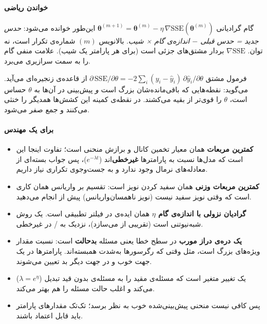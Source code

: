 \paragraph{خواندن ریاضی}

گام گرادیانی
\(\boldsymbol\theta^{(m+1)} = \boldsymbol\theta^{(m)} - \eta\,\nabla \mathrm{SSE}(\boldsymbol\theta^{(m)})\)
این‌طور خوانده می‌شود: \emph{حدس جدید = حدس قبلی \ensuremath{-} اندازه‌ی گام × شیب}.
بالانویس \((m)\) شماره‌ی تکرار است، نه توان. \(\nabla \mathrm{SSE}\)
بردار مشتق‌های جزئی است (برای هر پارامتر یک شیب). علامت منفی گام را به
سمت سرازیری می‌برد.

فرمول مشتق
\(\partial\,\mathrm{SSE}/\partial\theta = -2\sum_i (y_i - \hat y_i)\,\partial \hat y_i/\partial\theta\)
از قاعده‌ی زنجیره‌ای می‌آید. می‌گوید: نقطه‌هایی که باقی‌مانده‌شان بزرگ است
\emph{و} پیش‌بینی در آن‌ها به \(\theta\) حساس است، \(\theta\) را قوی‌تر از
بقیه می‌کشند. در نقطه‌ی کمینه این کشش‌ها همدیگر را خنثی می‌کنند و جمع صفر
می‌شود.

\paragraph{برای یک مهندس}

\begin{itemize}
\tightlist
\item
  \textbf{کمترین مربعات} همان معیار تخمین کانال و برازش منحنی است؛ تفاوت
  اینجا این است که مدل‌ها نسبت به پارامترها \textbf{غیرخطی}‌اند
  (\(e^{-\lambda t}\))، پس جواب بسته‌ای از معادله‌های نرمال وجود ندارد و
  به جست‌وجوی تکراری نیاز داریم.
\item
  \textbf{کمترین مربعات وزنی} همان سفید کردن نویز 
  است: تقسیم بر واریانس همان کاری است که وقتی نویز سفید نیست (نویز
  ناهمسان‌واریانس) پیش از  انجام می‌دهید.
\item
  \textbf{گرادیان نزولی با اندازه‌ی گام \(\eta\)} همان ایده‌ی  در فیلتر تطبیقی  است.  یک روش شبه‌نیوتنی است
  (تقریبی از  می‌سازد)، نزدیک به  /
   در  غیرخطی.
\item
  \textbf{یک دره‌ی دراز مورب} در سطح خطا یعنی مسئله \textbf{بدحالت
  } است: نسبت مقدار ویژه‌های  بزرگ است،
  مثل وقتی که رگرسورها به‌شدت همبسته‌اند. پارامترها در یک جهت خوب و در جهت
  دیگر بد تعیین می‌شوند.
\item
  \textbf{} (\(\lambda = e^{\eta}\)) یک تغییر
  متغیر است که مسئله‌ی مقید را به مسئله‌ی بدون قید تبدیل می‌کند و اغلب حالت
   مسئله را هم بهتر می‌کند.
\item
  پس کافی نیست منحنی پیش‌بینی‌شده خوب به نظر برسد؛ تک‌تک مقدارهای پارامتر
  باید قابل اعتماد باشند.
\end{itemize}

